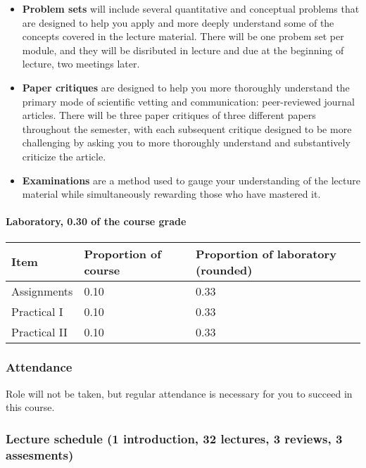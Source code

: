 \documentclass[]{article}
\providecommand{\tightlist}{%
  \setlength{\itemsep}{0pt}\setlength{\parskip}{0pt}}
\let\oldparagraph\paragraph
\renewcommand{\paragraph}[1]{\oldparagraph{#1}\mbox{}}
\begin{document}
\begin{itemize}
\tightlist
\item
  \textbf{Problem sets} will include several quantitative and conceptual
  problems that are designed to help you apply and more deeply
  understand some of the concepts covered in the lecture material. There
  will be one probem set per module, and they will be disributed in
  lecture and due at the beginning of lecture, two meetings later.
\item
  \textbf{Paper critiques} are designed to help you more thoroughly
  understand the primary mode of scientific vetting and communication:
  peer-reviewed journal articles. There will be three paper critiques of
  three different papers throughout the semester, with each subsequent
  critique designed to be more challenging by asking you to more
  thoroughly understand and substantively criticize the article.
\item
  \textbf{Examinations} are a method used to gauge your understanding of
  the lecture material while simultaneously rewarding those who have
  mastered it.
\end{itemize}

\paragraph{Laboratory, 0.30 of the course
grade}\label{laboratory-0.30-of-the-course-grade}

\begin{longtable}[]{@{}lll@{}}
\toprule
Item & Proportion of course & Proportion of laboratory
(rounded)\tabularnewline
\midrule
\endhead
Assignments & 0.10 & 0.33\tabularnewline
Practical I & 0.10 & 0.33\tabularnewline
Practical II & 0.10 & 0.33\tabularnewline
\bottomrule
\end{longtable}

\subsubsection{Attendance }\label{attendance}

Role will not be taken, but regular attendance is necessary for you to
succeed in this course.

\subsubsection{Lecture schedule (1 introduction, 32 lectures, 3 reviews,
3 assesments)
}\label{lecture-schedule-1-introduction-32-lectures-3-reviews-3-assesments}
\end{document}
